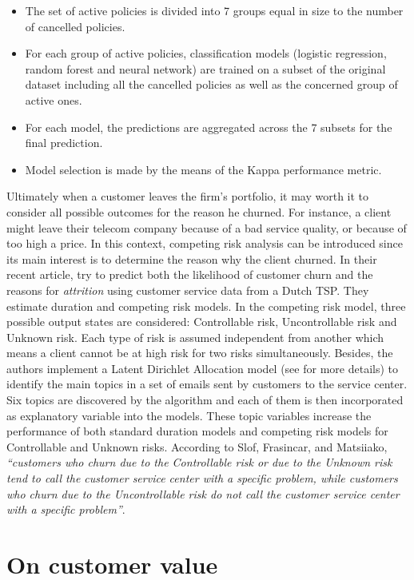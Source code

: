 \documentclass[
]{book}
\providecommand{\tightlist}{%
  \setlength{\itemsep}{0pt}\setlength{\parskip}{0pt}}
\begin{document}
\begin{itemize}
\tightlist
\item
  The set of active policies is divided into 7 groups equal in size to the number of cancelled policies.
\item
  For each group of active policies, classification models (logistic regression, random forest and neural network) are trained on a subset of the original dataset including all the cancelled policies as well as the concerned group of active ones.
\item
  For each model, the predictions are aggregated across the 7 subsets for the final prediction.
\item
  Model selection is made by the means of the Kappa performance metric.
\end{itemize}

Ultimately when a customer leaves the firm's portfolio, it may worth it to consider all possible outcomes for the reason he churned. For instance, a client might leave their telecom company because of a bad service quality, or because of too high a price. In this context, competing risk analysis can be introduced since its main interest is to determine the reason why the client churned. In their recent article, \citet{COMPETING_RISKS} try to predict both the likelihood of customer churn and the reasons for \emph{attrition} using customer service data from a Dutch TSP. They estimate duration and competing risk models. In the competing risk model, three possible output states are considered: Controllable risk, Uncontrollable risk and Unknown risk. Each type of risk is assumed independent from another which means a client cannot be at high risk for two risks simultaneously. Besides, the authors implement a Latent Dirichlet Allocation model (see \citet{LDA} for more details) to identify the main topics in a set of emails sent by customers to the service center. Six topics are discovered by the algorithm and each of them is then incorporated as explanatory variable into the models. These topic variables increase the performance of both standard duration models and competing risk models for Controllable and Unknown risks. According to Slof, Frasincar, and Matsiiako, \emph{``customers who churn due to the Controllable risk or due to the Unknown risk tend to call the customer service center with a specific problem, while customers who churn due to the Uncontrollable risk do not call the customer service center with a specific problem''}.

\hypertarget{value}{%
\section{On customer value}\label{value}}
\end{document}
